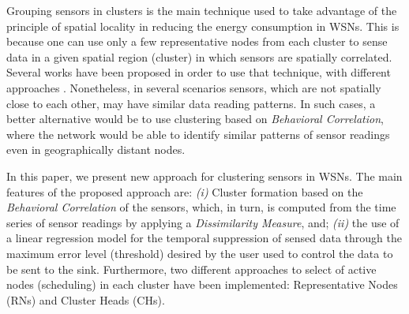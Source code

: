 \documentclass[conference]{IEEEtran}
\begin{document}

Grouping sensors in clusters is the main technique used to take advantage of the
principle of spatial locality in reducing the energy consumption in WSNs. This
is because one can use only a few representative nodes from each cluster to
sense data in a given spatial region (cluster) in which sensors are spatially
correlated.
Several works have been proposed in order to use that technique, with different
approaches \cite{Chu2006, Villas2012, Singh2010, Liu2007, Shah2007}.
Nonetheless, in several scenarios sensors, which are not spatially close to each
other, may have similar data reading patterns. In such cases, a better
alternative would be to use clustering based on \textit{Behavioral Correlation},
where the network would be able to identify similar patterns of sensor readings
even in geographically distant nodes.

In this paper, we present new approach for clustering sensors in WSNs. The main
features of the proposed approach are: {\it (i)} Cluster formation based on the
\textit{Behavioral Correlation} of the sensors, which, in turn, is computed 
from the time series of sensor readings by applying a \textit{Dissimilarity
Measure}, and; {\it (ii)} the use of a linear regression model for the temporal
suppression of sensed data through the maximum error level (threshold) desired
by the user used to control the data to be sent to the sink. Furthermore, two
different approaches to select of active nodes (scheduling) in each cluster have
been implemented: Representative Nodes (RNs) and Cluster Heads (CHs).
\end{document}
